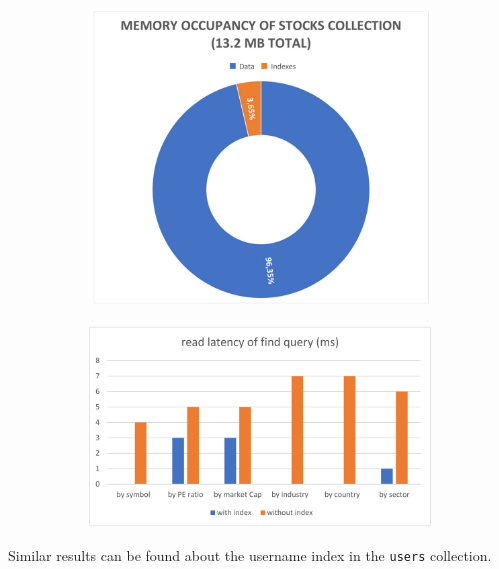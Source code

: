 \begin{figure}[H]
\hspace{-1.0cm}
\centering
\begin{subfigure}{.5\textwidth}
  \centering
  \includegraphics[scale=0.11]{img/memory_mongo.png}
\end{subfigure}%
\begin{subfigure}{.5\textwidth}
  \centering
  \includegraphics[scale=0.11]{img/latency_mongo.png}
\end{subfigure}
\end{figure}
\noindent Similar results can be found about the username index in the
\texttt{users} collection.
